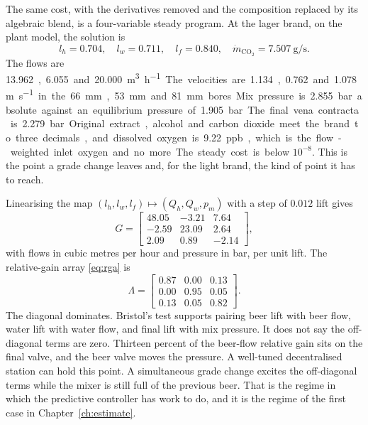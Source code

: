 The same cost, with the derivatives removed and the composition replaced by its algebraic blend, is a four-variable steady program. At the lager brand, on the plant model, the solution is
\begin{equation}
\label{eq:usteady}
l_h = 0.704,\quad
l_w = 0.711,\quad
l_f = 0.840,\quad
\dot m_{\mathrm{CO_2}} = \SI{7.507}{\gram\per\second}.
\end{equation}
The flows are \SI{13.962}, \SI{6.055} and \SI{20.000}{\cubic\metre\per\hour}. The velocities are \SI{1.134}, \SI{0.762} and \SI{1.078}{\metre\per\second} in the \SI{66}{\milli\metre}, \SI{53}{\milli\metre} and \SI{81}{\milli\metre} bores. Mix pressure is \SI{2.855}{bar} absolute against an equilibrium pressure of \SI{1.905}{bar}. The final vena contracta is \SI{2.279}{bar}. Original extract, alcohol and carbon dioxide meet the brand to three decimals, and dissolved oxygen is \SI{9.22}{ppb}, which is the flow-weighted inlet oxygen and no more. The steady cost is below $10^{-8}$. This is the point a grade change leaves and, for the light brand, the kind of point it has to reach.

Linearising the map $(l_h,l_w,l_f)\mapsto(Q_h,Q_w,p_m)$ with a step of $0.012$ lift gives
\begin{equation}
\label{eq:G}
G
=
\begin{bmatrix}
48.05 & -3.21 & 7.64 \\
-2.59 & 23.09 & 2.64 \\
2.09 & 0.89 & -2.14
\end{bmatrix},
\end{equation}
with flows in cubic metres per hour and pressure in bar, per unit lift. The relative-gain array \eqref{eq:rga} is
\begin{equation}
\label{eq:RGAnum}
\Lambda
=
\begin{bmatrix}
0.87 & 0.00 & 0.13 \\
0.00 & 0.95 & 0.05 \\
0.13 & 0.05 & 0.82
\end{bmatrix}.
\end{equation}
The diagonal dominates. Bristol's test supports pairing beer lift with beer flow, water lift with water flow, and final lift with mix pressure. It does not say the off-diagonal terms are zero. Thirteen percent of the beer-flow relative gain sits on the final valve, and the beer valve moves the pressure. A well-tuned decentralised station can hold this point. A simultaneous grade change excites the off-diagonal terms while the mixer is still full of the previous beer. That is the regime in which the predictive controller has work to do, and it is the regime of the first case in Chapter~\ref{ch:estimate}.

